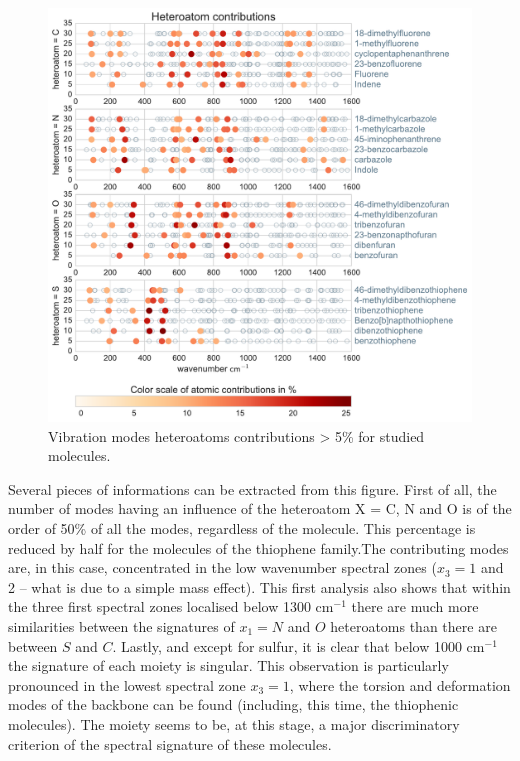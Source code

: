 	
	\begin{figure}[H]
		\begin{center}
			\includegraphics[scale=0.54]{image/P22}
		\end{center}
		\caption{Vibration modes heteroatoms contributions > 5\% for studied molecules.} \label{figP2-2}
	\end{figure}
	
Several pieces of informations can be extracted from this figure. First of all, the number of modes having an influence of the heteroatom X = C, N and O is of the order of 50\% of all the modes, regardless of the molecule. This percentage is reduced by half for the molecules of the thiophene family.The contributing modes are, in this case, concentrated in the low wavenumber spectral zones ($x_3=1$ and 2 – what is due to a simple mass effect). This first analysis also shows that within the three first spectral zones localised below 1300 cm$^{-1}$ there are much more similarities between the signatures of $x_1=N$ and $O$ heteroatoms than there are between $S$ and $C$. Lastly, and except for sulfur, it is clear that below 1000 cm$^{-1}$ the signature of each moiety is singular. This observation is particularly pronounced in the lowest spectral zone $x_3=1$, where the torsion and deformation modes of the backbone can be found (including, this time, the thiophenic molecules). The moiety seems to be, at this stage, a major discriminatory criterion of the spectral signature of these molecules. 
	
